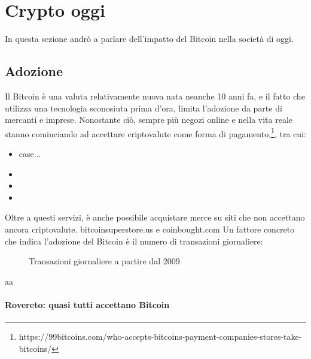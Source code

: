 \documentclass {article}
\begin{document}
\newpage


\section {Crypto oggi}


In questa sezione andrò a parlare dell'impatto del Bitcoin nella società di oggi.


\subsection {Adozione}


Il Bitcoin è una valuta relativamente nuova nata neanche 10 anni fa, e il fatto che utilizza una tecnologia sconosiuta prima d'ora, limita l'adozione da parte di mercanti e imprese.
Nonostante ciò, sempre più negozi online e nella vita reale stanno cominciando ad accettare criptovalute come forma di pagamento,\footnote{https://99bitcoins.com/who-accepts-bitcoins-payment-companies-stores-take-bitcoins/}, tra cui:

\begin{itemize}
\item case...
\item 
\item 
\item 
\end{itemize}
Oltre a questi servizi, è anche possibile acquistare merce su siti che non accettano ancora criptovalute. bitcoinsuperstore.us e coinbought.com
Un fattore concreto che indica l'adozione del Bitcoin è il numero di transazioni giornaliere:

\vspace {0.5cm}
\begin{figure}[htb!]
\caption {Transazioni giornaliere a partire dal 2009}
\end{figure}
\vspace {0.2cm}
\noindent
%
aa


\paragraph {Rovereto: quasi tutti accettano Bitcoin}
\end{document}
